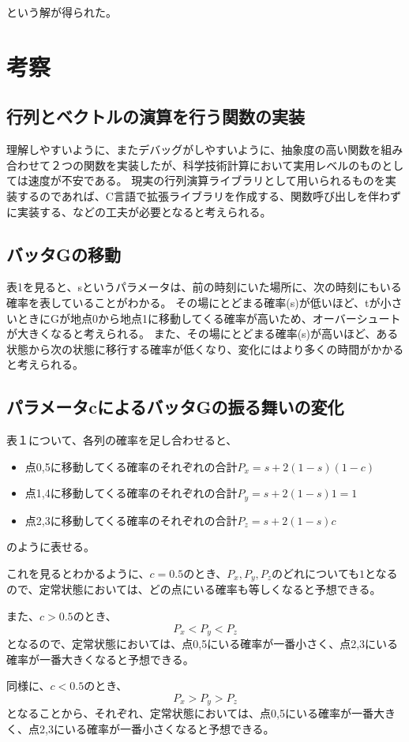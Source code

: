 \documentclass[11pt]{ltjsarticle}
\begin{document}
という解が得られた。


\section{考察}
\subsection{行列とベクトルの演算を行う関数の実装}
	理解しやすいように、またデバッグがしやすいように、抽象度の高い関数を組み合わせて２つの関数を実装したが、科学技術計算において実用レベルのものとしては速度が不安である。
	現実の行列演算ライブラリとして用いられるものを実装するのであれば、C言語で拡張ライブラリを作成する、関数呼び出しを伴わずに実装する、などの工夫が必要となると考えられる。

\subsection{バッタGの移動}
	表1を見ると、sというパラメータは、前の時刻にいた場所に、次の時刻にもいる確率を表していることがわかる。
	その場にとどまる確率(s)が低いほど、tが小さいときにGが地点0から地点1に移動してくる確率が高いため、オーバーシュートが大きくなると考えられる。
	また、その場にとどまる確率(s)が高いほど、ある状態から次の状態に移行する確率が低くなり、変化にはより多くの時間がかかると考えられる。

\subsection{パラメータcによるバッタGの振る舞いの変化}
	表１について、各列の確率を足し合わせると、
	\begin{itemize}
		\item 点0,5に移動してくる確率のそれぞれの合計$P_x = s + 2(1-s)(1-c)$
		\item 点1,4に移動してくる確率のそれぞれの合計$P_y = s + 2(1-s)1 = 1$
		\item 点2,3に移動してくる確率のそれぞれの合計$P_z = s + 2(1-s)c$
	\end{itemize}
	のように表せる。

	これを見るとわかるように、$c = 0.5$のとき、$P_x, P_y, P_z$のどれについても$1$となるので、定常状態においては、どの点にいる確率も等しくなると予想できる。

	また、$c > 0.5$のとき、
		$$P_x < P_y < P_z$$
	となるので、定常状態においては、点0,5にいる確率が一番小さく、点2,3にいる確率が一番大きくなると予想できる。

	同様に、$c < 0.5$のとき、
		$$P_x > P_y > P_z$$
	となることから、それぞれ、定常状態においては、点0,5にいる確率が一番大きく、点2,3にいる確率が一番小さくなると予想できる。
\end{document}
